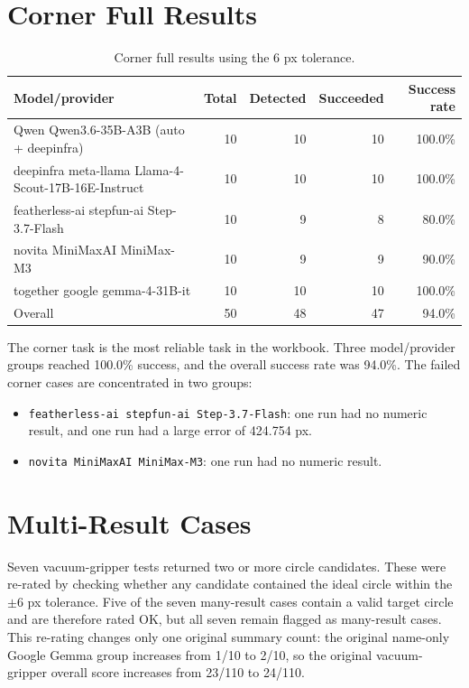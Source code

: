 \documentclass[11pt,a4paper]{article}
\begin{document}
\section{Corner Full Results}

\begin{table}[ht]
\centering
\small
\begin{tabular}{L{7.4cm}rrrr}
\toprule
Model/provider & Total & Detected & Succeeded & Success rate \\
\midrule
Qwen Qwen3.6-35B-A3B (auto + deepinfra) & 10 & 10 & 10 & 100.0\% \\
deepinfra meta-llama Llama-4-Scout-17B-16E-Instruct & 10 & 10 & 10 & 100.0\% \\
featherless-ai stepfun-ai Step-3.7-Flash & 10 & 9 & 8 & 80.0\% \\
novita MiniMaxAI MiniMax-M3 & 10 & 9 & 9 & 90.0\% \\
together google gemma-4-31B-it & 10 & 10 & 10 & 100.0\% \\
\midrule
Overall & 50 & 48 & 47 & 94.0\% \\
\bottomrule
\end{tabular}
\caption{Corner full results using the 6 px tolerance.}
\end{table}

The corner task is the most reliable task in the workbook. Three model/provider groups reached 100.0\% success, and the overall success rate was 94.0\%. The failed corner cases are concentrated in two groups:

\begin{itemize}
  \item \texttt{featherless-ai stepfun-ai Step-3.7-Flash}: one run had no numeric result, and one run had a large error of 424.754 px.
  \item \texttt{novita MiniMaxAI MiniMax-M3}: one run had no numeric result.
\end{itemize}

\section{Multi-Result Cases}

\clearpage
Seven vacuum-gripper tests returned two or more circle candidates. These were re-rated by checking whether any candidate contained the ideal circle within the \(\pm 6\) px tolerance. Five of the seven many-result cases contain a valid target circle and are therefore rated OK, but all seven remain flagged as many-result cases. This re-rating changes only one original summary count: the original name-only Google Gemma group increases from 1/10 to 2/10, so the original vacuum-gripper overall score increases from 23/110 to 24/110.
\end{document}
